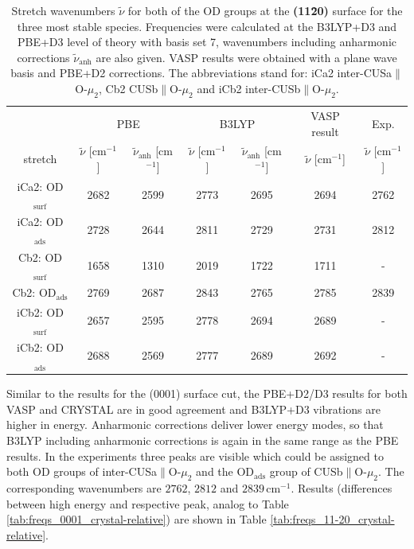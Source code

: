 \documentclass[11pt,DIV=13,BCOR=5mm,a4paper,headinclude]{scrbook}
\begin{document}
\begin{table}[!h]
  \centering
  \caption{Stretch wavenumbers $\tilde{\nu}$ for both of the OD groups at the \textbf{(11\=20)} surface for the three most stable species.
Frequencies were calculated at the B3LYP+D3 and PBE+D3 level of theory with basis set 7, wavenumbers including anharmonic corrections $\tilde{\nu}_\textrm{anh}$ are also given.
VASP results were obtained with a plane wave basis and PBE+D2 corrections.
The abbreviations stand for: iCa2 inter-CUSa$\parallel$O-$\mu_2$, Cb2 CUSb$\parallel$O-$\mu_2$ and iCb2 inter-CUSb$\parallel$O-$\mu_2$.}
  \begin{tabular}{ccc|cc|c|c}
  \toprule
   & \multicolumn{2}{c}{PBE} & \multicolumn{2}{c}{B3LYP} &VASP result&Exp.\\
  stretch & $\tilde{\nu}$ [cm$^{-1}$] &$\tilde{\nu}_\textrm{anh}$ [cm$^{-1}$] &$\tilde{\nu}$ [cm$^{-1}$] & $\tilde{\nu}_\textrm{anh}$ [cm$^{-1}$]&$\tilde{\nu}$ [cm$^{-1}$]&$\tilde{\nu}$ [cm$^{-1}$]\\\midrule
  iCa2: OD$_{\textrm{surf}}$ &2682 &2599 &2773 &2695 & 2694&2762\\
  iCa2: OD$_{\textrm{ads}}$  &2728 &2644 &2811 &2729 & 2731&2812\\
  Cb2: OD$_{\textrm{surf}}$  &1658 &1310 &2019 &1722 & 1711&-\\
  Cb2: OD$_{\textrm{ads}}$   &2769 &2687 &2843 &2765 & 2785&2839\\
  iCb2: OD$_{\textrm{surf}}$ &2657 &2595 &2778 &2694 & 2689&-\\
  iCb2: OD$_{\textrm{ads}}$  &2688 &2569 &2777 &2689 & 2692&-\\\bottomrule
  \end{tabular}
  \label{tab:freqs_11-20_crystal}
\end{table}
Similar to the results for the (0001) surface cut, the PBE+D2/D3 results for both VASP and CRYSTAL are in good agreement and B3LYP+D3 vibrations are higher in energy.
Anharmonic corrections deliver lower energy modes, so that B3LYP including anharmonic corrections is again in the same range as the PBE results.
In the experiments \cite{Heiden11-20_2018} three peaks are visible which could be assigned to both OD groups of inter-CUSa$\parallel$O-$\mu_2$ and the OD$_\textrm{ads}$ group of CUSb$\parallel$O-$\mu_2$.
The corresponding wavenumbers are $2762$, $2812$ and $2839\,$cm$^{-1}$.
Results (differences between high energy and respective peak, analog to Table \ref{tab:freqs_0001_crystal-relative}) are shown in Table \ref{tab:freqs_11-20_crystal-relative}.
\end{document}

